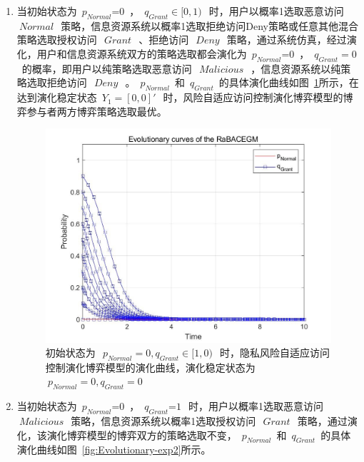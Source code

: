 \begin{enumerate}
 	\item 当初始状态为~${{p}_{Normal}}\text{=0}$~，~${{q}_{Grant}}\in [0,1)~$~时，用户以概率1选取恶意访问~$~Normal~$~策略，信息资源系统以概率1选取拒绝访问Deny策略或任意其他混合策略选取授权访问~$~Grant~$~、拒绝访问~$~Deny~$~策略，通过系统仿真，经过演化，用户和信息资源系统双方的策略选取都会演化为~${{p}_{Normal}}\text{=0}$~，~${{q}_{Grant}}=0~$~的概率，即用户以纯策略选取恶意访问~$~Malicious~$~，信息资源系统以纯策略选取拒绝访问~$~Deny~$~。~${{p}_{Normal}}$~和~${{q}_{Grant}}$~的具体演化曲线如图~\ref{fig:Evolutionary-exp1}所示，在达到演化稳定状态~${{Y}_{1}}=[0,0]'~$~时，风险自适应访问控制演化博弈模型的博弈参与者两方博弈策略选取最优。
 	
 	 \begin{figure}[htbp]
 		\centering
 		\includegraphics[width=0.8\linewidth]{./figures/Evolutionary-exp1.jpg}
 		\centering
 		\caption{初始状态为~$~p_{Normal}=0,q_{Grant}∈[1,0)~$~时，隐私风险自适应访问控制演化博弈模型的演化曲线，演化稳定状态为~$~p_{Normal}=0, q_{Grant}=0~$~}\label{fig:Evolutionary-exp1}
 	\end{figure}
 
 	\item 当初始状态为~${{p}_{Normal}}\text{=0}$~，~${{q}_{Grant}}\text{=}1~$~时，用户以概率1选取恶意访问~$~Malicious~$~策略，信息资源系统以概率1选取授权访问~$~Grant~$~策略，通过演化，该演化博弈模型的博弈双方的策略选取不变，~${{p}_{Normal}}$~和~${{q}_{Grant}}$~的具体演化曲线如图~\ref{fig:Evolutionary-exp2}所示。
 	

\end{enumerate}
